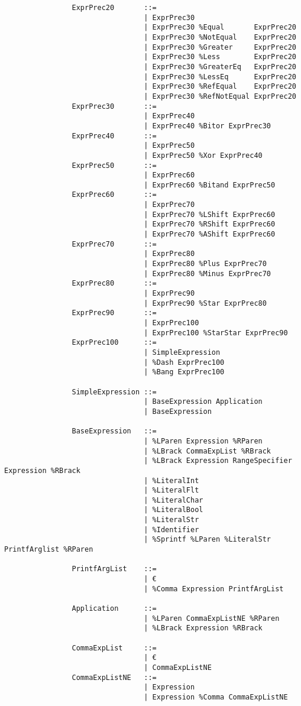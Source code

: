 \documentclass{article}
\begin{document}
\begin{verbatim}
				ExprPrec20       ::= 
				                 | ExprPrec30
				                 | ExprPrec30 %Equal       ExprPrec20
				                 | ExprPrec30 %NotEqual    ExprPrec20
				                 | ExprPrec30 %Greater     ExprPrec20
				                 | ExprPrec30 %Less        ExprPrec20
				                 | ExprPrec30 %GreaterEq   ExprPrec20
				                 | ExprPrec30 %LessEq      ExprPrec20
				                 | ExprPrec30 %RefEqual    ExprPrec20
				                 | ExprPrec30 %RefNotEqual ExprPrec20
				ExprPrec30       ::=
				                 | ExprPrec40
				                 | ExprPrec40 %Bitor ExprPrec30
				ExprPrec40       ::=
				                 | ExprPrec50
				                 | ExprPrec50 %Xor ExprPrec40
				ExprPrec50       ::=
				                 | ExprPrec60
				                 | ExprPrec60 %Bitand ExprPrec50
				ExprPrec60       ::=
				                 | ExprPrec70
				                 | ExprPrec70 %LShift ExprPrec60
				                 | ExprPrec70 %RShift ExprPrec60
				                 | ExprPrec70 %AShift ExprPrec60
				ExprPrec70       ::=
				                 | ExprPrec80
				                 | ExprPrec80 %Plus ExprPrec70
				                 | ExprPrec80 %Minus ExprPrec70
				ExprPrec80       ::=
				                 | ExprPrec90
				                 | ExprPrec90 %Star ExprPrec80
				ExprPrec90       ::=
				                 | ExprPrec100
				                 | ExprPrec100 %StarStar ExprPrec90
				ExprPrec100      ::=
				                 | SimpleExpression
				                 | %Dash ExprPrec100
				                 | %Bang ExprPrec100
				                 
				SimpleExpression ::=
				                 | BaseExpression Application
				                 | BaseExpression
				
				BaseExpression   ::=
				                 | %LParen Expression %RParen
				                 | %LBrack CommaExpList %RBrack
				                 | %LBrack Expression RangeSpecifier Expression %RBrack
				                 | %LiteralInt
				                 | %LiteralFlt
				                 | %LiteralChar
				                 | %LiteralBool
				                 | %LiteralStr
				                 | %Identifier
				                 | %Sprintf %LParen %LiteralStr PrintfArglist %RParen
				                 
				PrintfArgList    ::=
				                 | €
				                 | %Comma Expression PrintfArgList
				                 
				Application      ::=
				                 | %LParen CommaExpListNE %RParen
				                 | %LBrack Expression %RBrack
				
				CommaExpList     ::=
				                 | €
				                 | CommaExpListNE
				CommaExpListNE   ::=
				                 | Expression
				                 | Expression %Comma CommaExpListNE
			\end{verbatim}
	
\end{document}
